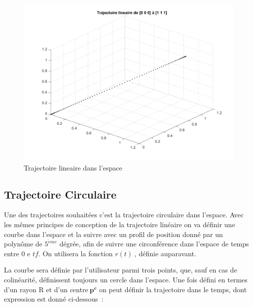 \documentclass{article} %
\begin{document}
\begin{figure}[h]	%
	\includegraphics[width=\textwidth]{TrajFig3.png}
	\caption{Trajectoire lineaire dans l'espace}
	\label{eller3}
\end{figure}



\subsection{Trajectoire Circulaire}

Une des trajectoires souhait\'{e}es c'est la trajectoire circulaire dans l'espace. Avec les m\^{e}mes principes de conception de la trajectoire lin\'{e}aire on va d\'{e}finir une courbe dans l'espace et la suivre avec un profil de position donn\'{e} par un polyn\^{o}me de ${5}^{\grave{e}me}$ d\'{e}gr\'{e}e, afin de suivre une circonf\'{e}rence dans l'espace de temps entre 0 e $tf$. On utilisera la fonction $r\left(t\right)\ ,\ $d\'{e}finie auparavant.

La courbe sera d\'{e}finie par l'utilisateur parmi trois points, que, sauf en cas de colin\'{e}arit\'{e}, d\'{e}finissent toujours un cercle dans l'espace. Une fois d\'{e}fini en termes d'un rayon R et d'un centre${\boldsymbol{\ }\boldsymbol{p}}^{\boldsymbol{c}}$ on peut d\'{e}finir la trajectoire dans le temps, dont expression est donn\'{e} ci-dessous~: 

\
\end{document}
